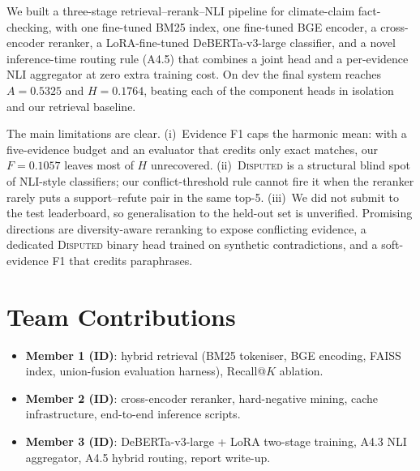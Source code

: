 \documentclass[11pt]{article}
\begin{document}
We built a three-stage retrieval--rerank--NLI pipeline for
climate-claim fact-checking, with one fine-tuned BM25 index, one
fine-tuned BGE encoder, a cross-encoder reranker, a
LoRA-fine-tuned DeBERTa-v3-large classifier, and a novel
inference-time routing rule (A4.5) that combines a joint head and a
per-evidence NLI aggregator at zero extra training cost. On dev the
final system reaches $A=0.5325$ and $H=0.1764$, beating each of the
component heads in isolation and our retrieval baseline.

The main limitations are clear. (i)~Evidence F1 caps the harmonic
mean: with a five-evidence budget and an evaluator that credits only
exact matches, our $F=0.1057$ leaves most of $H$ unrecovered.
(ii)~\textsc{Disputed} is a structural blind spot of NLI-style
classifiers; our conflict-threshold rule cannot fire it when the
reranker rarely puts a support--refute pair in the same top-5.
(iii)~We did not submit to the test leaderboard, so generalisation
to the held-out set is unverified. Promising directions are
diversity-aware reranking to expose conflicting evidence, a
dedicated \textsc{Disputed} binary head trained on synthetic
contradictions, and a soft-evidence F1 that credits paraphrases.


\section*{Team Contributions}
\begin{itemize}
  \item \textbf{Member 1 (ID)}: hybrid retrieval (BM25 tokeniser,
        BGE encoding, FAISS index, union-fusion evaluation harness),
        Recall@$K$ ablation.
  \item \textbf{Member 2 (ID)}: cross-encoder reranker, hard-negative
        mining, cache infrastructure, end-to-end inference scripts.
  \item \textbf{Member 3 (ID)}: DeBERTa-v3-large + LoRA two-stage
        training, A4.3 NLI aggregator, A4.5 hybrid routing, report
        write-up.
\end{itemize}


\end{document}

